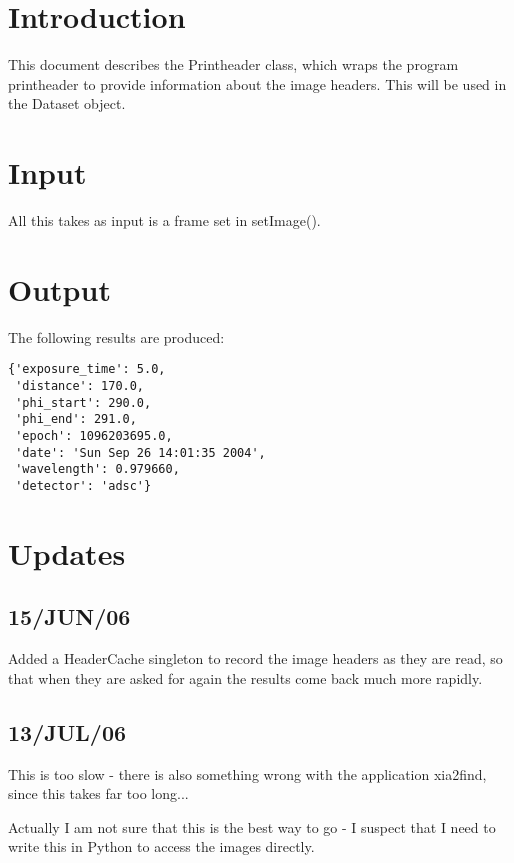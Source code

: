 \documentclass[a4paper, 11pt]{article}
\begin{document}
\section{Introduction}

This document describes the Printheader class, which wraps the program 
printheader to provide information about the image headers. This will
be used in the Dataset object.

\section{Input}

All this takes as input is a frame set in setImage().

\section{Output}

The following results are produced:

{
\small
\begin{verbatim}
{'exposure_time': 5.0, 
 'distance': 170.0, 
 'phi_start': 290.0, 
 'phi_end': 291.0, 
 'epoch': 1096203695.0, 
 'date': 'Sun Sep 26 14:01:35 2004', 
 'wavelength': 0.979660, 
 'detector': 'adsc'}
\end{verbatim}
}

\section{Updates}

\subsection{15/JUN/06}

Added a HeaderCache singleton to record the image headers as they are
read, so that when they are asked for again the results come back much 
more rapidly.

\subsection{13/JUL/06}

This is too slow - there is also something wrong with the application xia2find,
since this takes far too long...

Actually I am not sure that this is the best way to go - I suspect that I need
to write this in Python to access the images directly.
\end{document}
